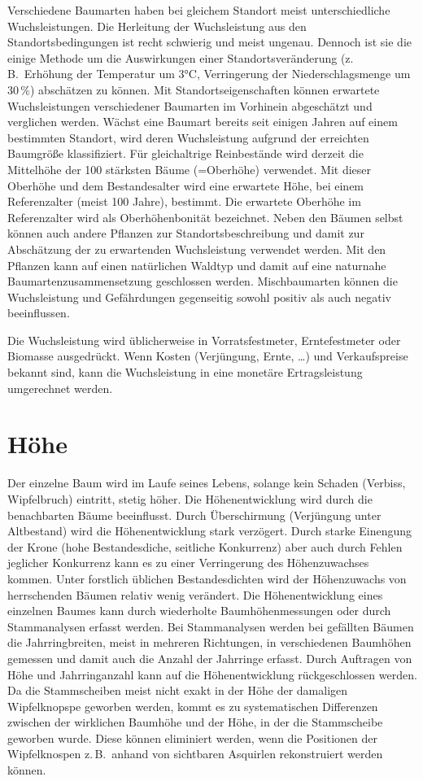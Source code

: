 \documentclass[twocolumn]{scrartcl}
\begin{document}
Verschiedene Baumarten haben bei gleichem Standort meist unterschiedliche
Wuchsleistungen. Die Herleitung der Wuchsleistung aus den Standortsbedingungen
ist recht schwierig und meist ungenau. Dennoch ist sie die einige Methode um die
Auswirkungen einer Standortsveränderung (z.\,B.\ Erhöhung der Temperatur um 3°C,
Verringerung der Niederschlagsmenge um 30\,\%) abschätzen zu können. Mit
Standortseigenschaften können erwartete Wuchsleistungen verschiedener Baumarten
im Vorhinein abgeschätzt und verglichen werden. Wächst eine Baumart bereits seit
einigen Jahren auf einem bestimmten Standort, wird deren Wuchsleistung aufgrund
der erreichten Baumgröße klassifiziert. Für gleichaltrige Reinbestände wird
derzeit die Mittelhöhe der 100 stärksten Bäume (=Oberhöhe) verwendet. Mit dieser
Oberhöhe und dem Bestandesalter wird eine erwartete Höhe, bei einem
Referenzalter (meist 100 Jahre), bestimmt. Die erwartete Oberhöhe im
Referenzalter wird als Oberhöhenbonität bezeichnet. Neben den Bäumen selbst
können auch andere Pflanzen zur Standortsbeschreibung und damit zur Abschätzung
der zu erwartenden Wuchsleistung verwendet werden. Mit den Pflanzen kann auf
einen natürlichen Waldtyp und damit auf eine naturnahe Baumartenzusammensetzung
geschlossen werden. Mischbaumarten können die Wuchsleistung und Gefährdungen
gegenseitig sowohl positiv als auch negativ beeinflussen.

Die Wuchsleistung wird üblicherweise in Vorratsfestmeter, Erntefestmeter oder
Biomasse ausgedrückt. Wenn Kosten (Verjüngung, Ernte, \dots) und Verkaufspreise
bekannt sind, kann die Wuchsleistung in eine monetäre Ertragsleistung
umgerechnet werden.

\section{Höhe}

Der einzelne Baum wird im Laufe seines Lebens, solange kein Schaden (Verbiss,
Wipfelbruch) eintritt, stetig höher. Die Höhenentwicklung wird durch die
benachbarten Bäume beeinflusst. Durch Überschirmung (Verjüngung unter
Altbestand) wird die Höhenentwicklung stark verzögert. Durch starke Einengung
der Krone (hohe Bestandesdiche, seitliche Konkurrenz) aber auch durch Fehlen
jeglicher Konkurrenz kann es zu einer Verringerung des Höhenzuwachses kommen.
Unter forstlich üblichen Bestandesdichten wird der Höhenzuwachs von herrschenden
Bäumen relativ wenig verändert. Die Höhenentwicklung eines einzelnen Baumes kann
durch wiederholte Baumhöhenmessungen oder durch Stammanalysen erfasst werden.
Bei Stammanalysen werden bei gefällten Bäumen die Jahrringbreiten, meist in
mehreren Richtungen, in verschiedenen Baumhöhen gemessen und damit auch die
Anzahl der Jahrringe erfasst. Durch Auftragen von Höhe und Jahrringanzahl kann
auf die Höhenentwicklung rückgeschlossen werden. Da die Stammscheiben meist
nicht exakt in der Höhe der damaligen Wipfelknopspe geworben werden, kommt es zu
systematischen Differenzen zwischen der wirklichen Baumhöhe und der Höhe, in der
die Stammscheibe geworben wurde. Diese können eliminiert werden, wenn die
Positionen der Wipfelknospen z.\,B.\ anhand von sichtbaren Asquirlen
rekonstruiert werden können.
\end{document}
